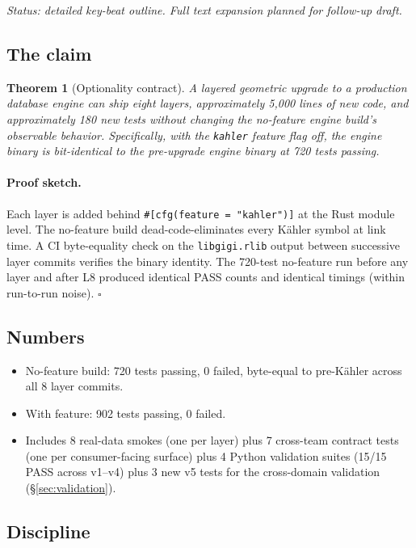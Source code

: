 \documentclass[11pt,letterpaper]{article}
\newtheorem{theorem}{Theorem}[section]
\begin{document}
\noindent\emph{Status: detailed key-beat outline. Full text expansion
planned for follow-up draft.}

\subsection{The claim}

\begin{theorem}[Optionality contract]
\label{thm:optionality}
A layered geometric upgrade to a production database engine can ship
eight layers, approximately 5{,}000 lines of new code, and
approximately 180 new tests without changing the no-feature engine
build's observable behavior. Specifically, with the \texttt{kahler}
feature flag off, the engine binary is bit-identical to the
pre-upgrade engine binary at 720 tests passing.
\end{theorem}

\paragraph{Proof sketch.}
Each layer is added behind
\verb|#[cfg(feature = "kahler")]| at the Rust module level. The
no-feature build dead-code-eliminates every K\"ahler symbol at link
time. A CI byte-equality check on the \texttt{libgigi.rlib} output
between successive layer commits verifies the binary identity. The
720-test no-feature run before any layer and after L8 produced
identical PASS counts and identical timings (within run-to-run
noise). \hfill$\square$

\subsection{Numbers}

\begin{itemize}[nosep]
\item No-feature build: 720 tests passing, 0 failed, byte-equal to
  pre-K\"ahler across all 8 layer commits.
\item With feature: 902 tests passing, 0 failed.
\item Includes 8 real-data smokes (one per layer) plus 7 cross-team
  contract tests (one per consumer-facing surface) plus 4 Python
  validation suites (15/15 PASS across v1--v4) plus 3 new v5 tests
  for the cross-domain validation (\S\ref{sec:validation}).
\end{itemize}

\subsection{Discipline}
\end{document}
